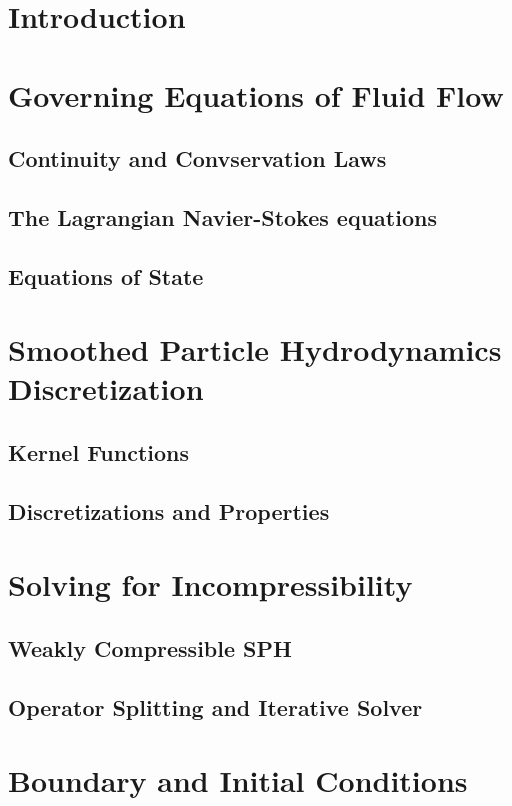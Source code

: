 \documentclass[oneside, a4paper]{book}
\begin{document}
\tableofcontents
\newpage


\chapter{Introduction}

\chapter{Governing Equations of Fluid Flow}
\section{Continuity and Convservation Laws}
\section{The Lagrangian Navier-Stokes equations}
\section{Equations of State}

\chapter{Smoothed Particle Hydrodynamics Discretization}
\section{Kernel Functions}
\section{Discretizations and Properties}

\chapter{Solving for Incompressibility}
\section{Weakly Compressible SPH}
\section{Operator Splitting and Iterative Solver}

\chapter{Boundary and Initial Conditions}
\end{document}
